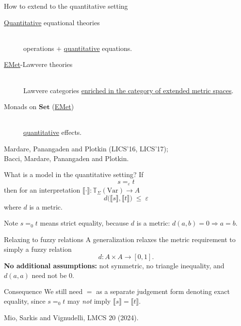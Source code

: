 \documentclass[10pt,aspectratio=169]{beamer}
\newcommand{\qeq}[1]{=_{#1}}
\newcommand{\den}[1]{\llbracket #1 \rrbracket}
\newcommand{\Terms}{\mathbb{T}}
\newcommand{\eps}{\varepsilon}
\begin{document}
\begin{frame}{How to extend to the quantitative setting}
  \begin{description}
    \item[\underline{Quantitative} equational theories]\hfill\\
      operations $+$ \underline{quantitative} equations.
      \medskip
    \item[\underline{EMet}-Lawvere theories]\hfill\\
      Lawvere categories \underline{enriched in the category of extended
      metric spaces}.
      \medskip
    \item[Monads on $\mathbf{Set}$ (\underline{EMet})]\hfill\\
      \underline{quantitative} effects.
  \end{description}
  \vfill
  \hfill{\small Mardare, Panangaden and Plotkin (LICS'16, LICS'17);}\\
  \hfill{\small Bacci, Mardare, Panangaden and Plotkin.}
\end{frame}

\begin{frame}{What is a model in the quantitative setting?}
  If
  \[ s \qeq{\eps} t \]
  then for an interpretation $\den{\cdot} : \Terms_\Sigma(\mathrm{Var}) \to A$
  \[ d\bigl(\den{s},\den{t}\bigr) \;\leq\; \eps \]
  where $d$ is a metric.
  \vfill
  \pause
  \begin{alertblock}{Note}
    $s \qeq{0} t$ means strict equality, because $d$ is a metric:
    $d(a,b) = 0 \Rightarrow a = b$.
  \end{alertblock}
\end{frame}

\begin{frame}{Relaxing to fuzzy relations}
  A generalization relaxes the metric requirement to simply a
  fuzzy relation
  \[ d : A \times A \longrightarrow [0,1] . \]
  \vfill
  \textbf{No additional assumptions:} not symmetric, no triangle
  inequality, and $d(a,a)$ need not be $0$.
  \vfill
  \pause
  \begin{alertblock}{Consequence}
    We still need $=$ as a separate judgement form denoting exact
    equality, since $s \qeq{0} t$ may \emph{not} imply
    $\den{s} = \den{t}$.
  \end{alertblock}
  \vfill
  \hfill{\small Mio, Sarkis and Vignudelli, LMCS 20 (2024).}
\end{frame}
\end{document}
